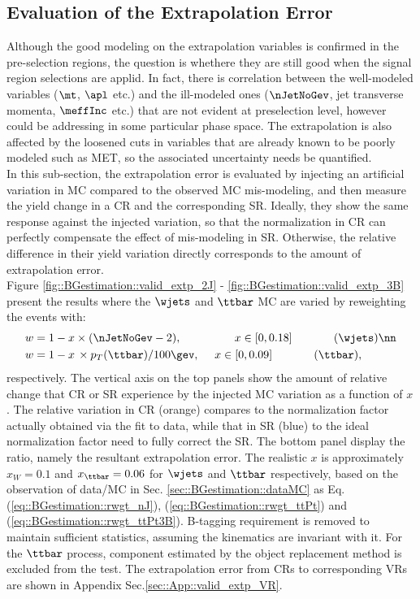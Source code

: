 \subsection{Evaluation of the Extrapolation Error} \label{sec::BGestimation::nonClosure_kineExtp}
Although the good modeling on the extrapolation variables is confirmed in the pre-selection regions, 
the question is whethere they are still good when the signal region selections are applid.
In fact, there is correlation between the well-modeled variables ($\mt$, $\apl$ etc.) and the ill-modeled ones ($\nJetNoGev$, jet transverse momenta, $\meffInc$ etc.) that are not evident at preselection level, however could be addressing in some particular phase space. 
The extrapolation is also affected by the loosened cuts in variables that are already known to be poorly modeled such as MET, so the associated uncertainty needs be quantified. \\

In this sub-section, the extrapolation error is evaluated by injecting an artificial variation in MC compared to the observed MC mis-modeling, and then measure the yield change in a CR and the corresponding SR. Ideally, they show the same response against the injected variation, so that the normalization in CR can perfectly compensate the effect of mis-modeling in SR. Otherwise, the relative difference in their yield variation directly corresponds to the amount of extrapolation error. \\

Figure \ref{fig::BGestimation::valid_extp_2J} - \ref{fig::BGestimation::valid_extp_3B} present the results where the $\wjets$ and $\ttbar$ MC are varied by reweighting the events with:
\begin{align}
 w & = 1 - x \times (\nJetNoGev-2), \mbox{\phantom{MMMM}}\,\,\,\,\,\, x \in [0,0.18]  \mbox{\phantom{MMMM}} (\wjets) \nn  \\
 w & = 1 - x \,\times p_T(\ttbar)/100\gev, \,\,\,\,\,\,\,\,           x \in [0,0.09]  \mbox{\phantom{MMMM}} (\ttbar),
\label{eq::BGestimation::injected_MCvariation}
\end{align}
respectively. The vertical axis on the top panels show the amount of relative change that CR or SR experience by the injected MC variation as a function of $x$. The relative variation in CR (orange) compares to the normalization factor actually obtained via the fit to data, while that in SR (blue) to the ideal normalization factor need to fully correct the SR. The bottom panel display the ratio, namely the resultant extrapolation error. The realistic $x$ is approximately $x_W=0.1$ and $x_{\ttbar}=0.06$ for $\wjets$ and $\ttbar$ respectively, based on the observation of data/MC in Sec. \ref{sec::BGestimation::dataMC} as Eq. (\ref{eq::BGestimation::rwgt_nJ}), (\ref{eq::BGestimation::rwgt_ttPt}) and (\ref{eq::BGestimation::rwgt_ttPt3B}). B-tagging requirement is removed to maintain sufficient statistics, assuming the kinematics are invariant with it. For the $\ttbar$ process, component estimated by the object replacement method is excluded from the test. The extrapolation error from CRs to corresponding VRs are shown in Appendix Sec.\ref{sec::App::valid_extp_VR}. \\

